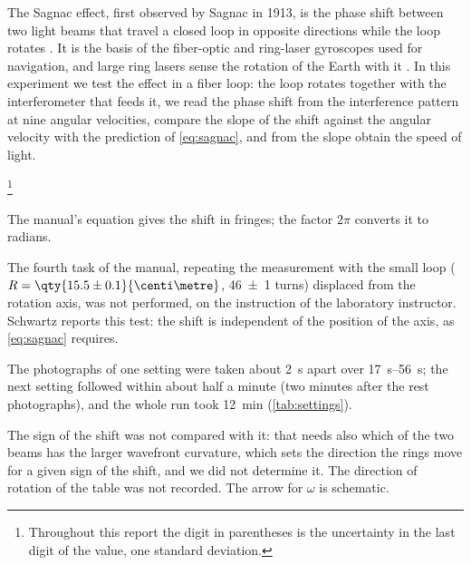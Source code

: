 The Sagnac effect, first observed by Sagnac in 1913, is the phase shift between two light beams that travel a closed loop in opposite directions while the loop rotates \cite{manual}. It is the basis of the fiber-optic and ring-laser gyroscopes used for navigation, and large ring lasers sense the rotation of the Earth with it \cite{manual}. In this experiment we test the effect in a fiber loop: the loop rotates together with the interferometer that feeds it, we read the phase shift from the interference pattern at nine angular velocities, compare the slope of the shift against the angular velocity with the prediction of \cref{eq:sagnac}, and from the slope obtain the speed of light.


\footnote{Throughout this report the digit in parentheses is the uncertainty in the last digit of the value, one standard deviation.}


The manual's equation gives the shift in fringes; the factor $2\pi$ converts it to radians.


The fourth task of the manual, repeating the measurement with the small loop ($R = \qty{15.5 \pm 0.1}{\centi\metre}$, \num{46 \pm 1} turns) displaced from the rotation axis, was not performed, on the instruction of the laboratory instructor. Schwartz \cite{schwartz} reports this test: the shift is independent of the position of the axis, as \cref{eq:sagnac} requires.


The photographs of one setting were taken about \qty{2}{\second} apart over \qtyrange{17}{56}{\second}; the next setting followed within about half a minute (two minutes after the rest photographs), and the whole run took \qty{12}{\minute} (\cref{tab:settings}).


The sign of the shift was not compared with it: that needs also which of the two beams has the larger wavefront curvature, which sets the direction the rings move for a given sign of the shift, and we did not determine it.
The direction of rotation of the table was not recorded.
The arrow for $\omega$ is schematic.


